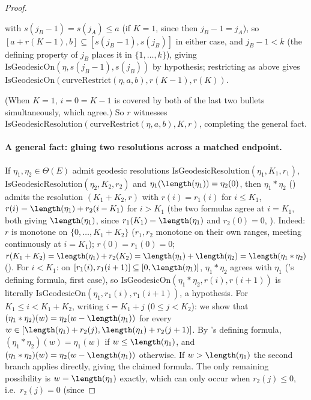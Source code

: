 \begin{proof}
\begin{itemize}
      with $s(j_B-1)=s(j_A)\le a$ (if $K=1$, since then $j_B-1=j_A$), so $[a+r(K-1),b] \subseteq
      [s(j_B-1),s(j_B)]$ in either case, and $j_B-1<k$ (the defining property of $j_B$ places it
      in $\{1,\dots,k\}$), giving $\mathrm{IsGeodesicOn}(\eta,s(j_B-1),s(j_B))$ by hypothesis;
      restricting as above gives $\mathrm{IsGeodesicOn}(\mathrm{curveRestrict}(\eta,a,b),r(K-1),r(K))$.
  \end{itemize}
  (When $K=1$, $i=0=K-1$ is covered by both of the last two bullets simultaneously, which agree.)
  So $r$ witnesses $\mathrm{IsGeodesicResolution}(\mathrm{curveRestrict}(\eta,a,b),K,r)$, completing
  the general fact.

  \paragraph{A general fact: gluing two resolutions across a matched endpoint.} If $\eta_1,\eta_2 \in
  \Theta(E)$ admit geodesic resolutions $\mathrm{IsGeodesicResolution}(\eta_1,K_1,r_1)$,
  $\mathrm{IsGeodesicResolution}(\eta_2,K_2,r_2)$ and $\eta_1(\length(\eta_1))=\eta_2(0)$, then
  $\eta_1 * \eta_2$ () admits the resolution $(K_1+K_2,r)$ with $r(i)=r_1(i)$
  for $i\le K_1$, $r(i)=\length(\eta_1)+r_2(i-K_1)$ for $i>K_1$ (the two formulas agree at $i=K_1$,
  both giving $\length(\eta_1)$, since $r_1(K_1)=\length(\eta_1)$ and $r_2(0)=0$,
  ). Indeed: $r$ is monotone on $\{0,\dots,K_1+K_2\}$ ($r_1,r_2$
  monotone on their own ranges, meeting continuously at $i=K_1$); $r(0)=r_1(0)=0$;
  $r(K_1+K_2)=\length(\eta_1)+r_2(K_2)=\length(\eta_1)+\length(\eta_2)=\length(\eta_1*\eta_2)$
  (). For $i<K_1$: on $[r_1(i),r_1(i+1)]\subseteq[0,\length(\eta_1)]$,
  $\eta_1*\eta_2$ agrees with $\eta_1$ ('s defining formula, first case), so
  $\mathrm{IsGeodesicOn}(\eta_1*\eta_2,r(i),r(i+1))$ is literally
  $\mathrm{IsGeodesicOn}(\eta_1,r_1(i),r_1(i+1))$, a hypothesis. For $K_1\le i<K_1+K_2$, writing
  $i=K_1+j$ ($0\le j<K_2$): we show that $(\eta_1*\eta_2)(w)=\eta_2(w-\length(\eta_1))$ for every
  $w\in[\length(\eta_1)+r_2(j),\length(\eta_1)+r_2(j+1)]$. By 's defining
  formula, $(\eta_1*\eta_2)(w)=\eta_1(w)$ if $w\le\length(\eta_1)$, and
  $(\eta_1*\eta_2)(w)=\eta_2(w-\length(\eta_1))$ otherwise. If $w>\length(\eta_1)$ the second
  branch applies directly, giving the claimed formula. The only remaining possibility is
  $w=\length(\eta_1)$ exactly, which can only occur when $r_2(j)\le0$, i.e.\ $r_2(j)=0$ (since

\end{proof}
